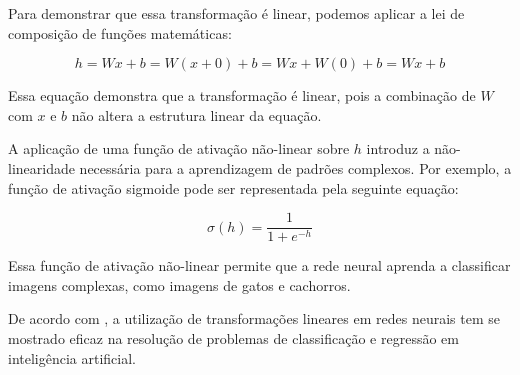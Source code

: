 Para demonstrar que essa transformação é linear, podemos aplicar a lei de composição de funções matemáticas:

\begin{equation}
	h = Wx + b = W(x + 0) + b = Wx + W(0) + b = Wx + b
\end{equation}

Essa equação demonstra que a transformação é linear, pois a combinação de $W$ com $x$ e $b$ não altera a estrutura linear da equação.

A aplicação de uma função de ativação não-linear sobre $h$ introduz a não-linearidade necessária para a aprendizagem de padrões complexos. Por exemplo, a função de ativação sigmoide pode ser representada pela seguinte equação:

\begin{equation}
	\sigma(h) = \frac{1}{1 + e^{-h}}
\end{equation}

Essa função de ativação não-linear permite que a rede neural aprenda a classificar imagens complexas, como imagens de gatos e cachorros.

De acordo com \cite{lecun2015}, a utilização de transformações lineares em redes neurais tem se mostrado eficaz na resolução de problemas de classificação e regressão em inteligência artificial.
